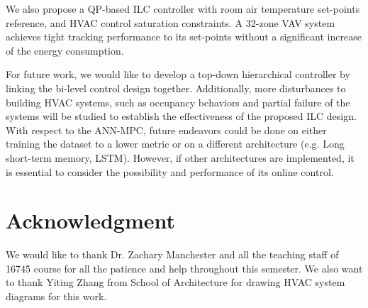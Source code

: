 \documentclass[conference]{IEEEtran}
\begin{document}
We also propose a QP-based ILC controller with room air temperature set-points reference, and HVAC control saturation constraints. A 32-zone VAV system achieves tight tracking performance to its set-points without a significant increase of the energy consumption. 

For future work, we would like to develop a top-down hierarchical controller by linking the bi-level control design together. Additionally, more disturbances to building HVAC systems, such as occupancy behaviors and partial failure of the systems will be studied to establish the effectiveness of the proposed ILC design. With respect to the ANN-MPC, future endeavors could be done on either training the dataset to a lower metric or on a different architecture (e.g. Long short-term memory, LSTM). However, if other architectures are implemented, it is essential to consider the possibility and performance of its online control.
\section*{Acknowledgment}

We would like to thank Dr. Zachary Manchester and all the teaching staff of 16745 course for all the patience and help throughout this semester. We also want to thank Yiting Zhang from School of Architecture for drawing HVAC system diagrams for this work.




\end{document}
